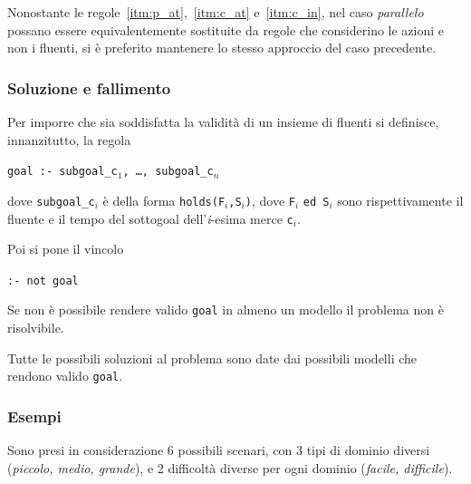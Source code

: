 \documentclass[a4paper,oneside,12pt]{book}
\begin{document}
    Nonostante le regole~\ref{itm:p_at},~\ref{itm:c_at} e~\ref{itm:c_in}, nel caso \textit{parallelo}
    possano essere equivalentemente sostituite da regole che considerino le azioni e non i fluenti,
    si è preferito mantenere lo stesso approccio del caso precedente.


    \subsubsection*{Soluzione e fallimento}
    Per imporre che sia soddisfatta la validità di un insieme di fluenti si definisce, innanzitutto, la regola
    \begin{center}
        \texttt{goal :- subgoal\_c$_1$, \dots, subgoal\_c$_n$}
    \end{center}
    dove \texttt{subgoal\_c$_i$} è della forma \texttt{holds(F$_i$,S$_i$)}, dove \texttt{F$_i$} \texttt{ed S$_i$}
    sono rispettivamente il fluente e il tempo del sottogoal dell'\textit{i}-esima merce \texttt{c$_i$}.

    Poi si pone il vincolo
    \begin{center}
        \texttt{:- not goal}
    \end{center}
    Se non è possibile rendere valido \texttt{goal} in almeno un modello il problema non è risolvibile.

    Tutte le possibili soluzioni al problema sono date dai possibili modelli che rendono valido \texttt{goal}.


    \subsubsection*{Esempi}
    Sono presi in considerazione 6 possibili scenari, con 3 tipi di dominio diversi (\textit{piccolo, medio, grande}),
    e 2 difficoltà diverse per ogni dominio (\textit{facile, difficile}).
\end{document}
